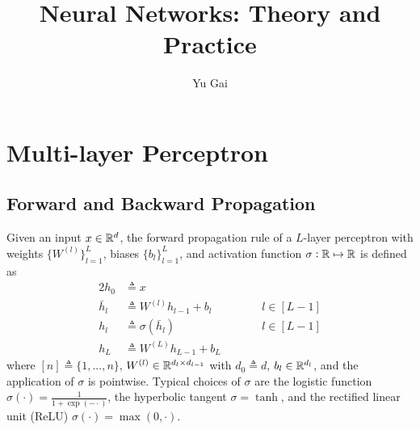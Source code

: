\documentclass{article}
\title{Neural Networks: Theory and Practice}
\author{Yu Gai}
\date{}
\begin{document}
\maketitle

\tableofcontents

\newpage

\section{Multi-layer Perceptron}

\subsection{Forward and Backward Propagation}

Given an input $x \in {\mathbb R}^d$, the forward propagation rule of a $L$-layer perceptron with weights $\{W^{(l)}\}_{l = 1}^L$, biases $\{b_l\}_{l = 1}^L$, and activation function $\sigma: {\mathbb R} \mapsto {\mathbb R}$ is defined as
\begin{alignat*}{2}
h_0 & \triangleq x \\
\bar{h}_l & \triangleq W^{(l)} h_{l - 1} + b_l && \qquad l \in [L - 1] \\
h_l & \triangleq \sigma (\bar{h}_l) && \qquad l \in [L - 1] \\
h_L & \triangleq W^{(L)} h_{L - 1} + b_L
\end{alignat*}
where $[n] \triangleq \{1, ..., n\}$, $W^{(l)} \in {\mathbb R}^{d_l \times d_{l - 1}}$ with $d_0 \triangleq d$, $b_l \in {\mathbb R}^{d_l}$, and the application of $\sigma$ is pointwise.
Typical choices of $\sigma$ are the logistic function $\sigma (\cdot) = \frac1{1 + \exp (-\cdot)}$, the hyperbolic tangent $\sigma = \tanh$, and the rectified linear unit (ReLU) $\sigma (\cdot) = \max (0, \cdot)$.
\end{document}
